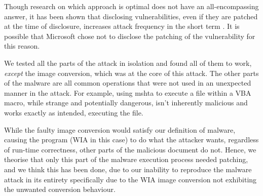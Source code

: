 Though research on which approach is optimal does not have an all-encompassing answer, it has been shown that disclosing 
vulnerabilities, even if they are patched at the time of disclosure, increases attack frequency in the short term 
\cite{vuln-disclosure, vuln-disclosure-impact}. It is possible that Microsoft chose not to disclose the patching of 
the vulnerability for this reason.

We tested all the parts of the attack in isolation and found all of them to work, \emph{except} the image conversion,
which was at the core of this attack. The other parts of the malware are all common operations that were not used in 
an unexpected manner in the attack. For example, using \acrshort{mshta} to execute a file within a \acrshort{VBA} macro,
while strange and potentially dangerous, isn't inherently malicious and works exactly as intended, executing the file.

While the faulty image conversion would satisfy our definition of malware, causing the program (\acrshort{WIA} in this case) 
to do what the attacker wants, regardless of run-time correctness, other parts of the malicious document do not. Hence,
we theorise that only this part of the malware execution process needed patching, and we think this has been done, due
to our inability to reproduce the malware attack in its entirety specifically due to the \acrshort{WIA} image conversion
not exhibiting the unwanted conversion behaviour.
\clearpage

